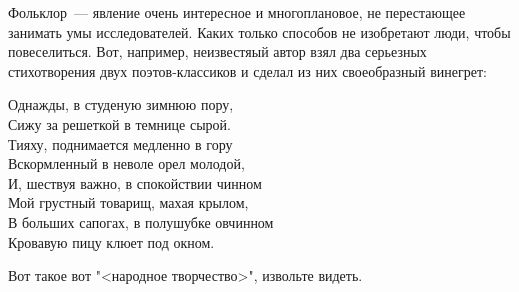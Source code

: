\documentclass[12pt]{article}
\begin{document}
Фольклор~--- явление очень интересное и многоплановое, не
перестающее занимать умы исследователей. Каких только
способов не изобретают люди, чтобы повеселиться. Вот,
например, неизвестяый автор взял два серьезных стихотворения
двух поэтов-классиков и сделал из них своеобразный винегрет:

\bigskip
\bigskip
\noindent Однажды, в студеную зимнюю пору, \\
Сижу за решеткой в темнице сырой.\\
Тияху, поднимается медленно в гору\\
Вскормленный в неволе орел молодой,\\
И, шествуя важно, в спокойствии чинном\\
Мой грустный товарищ, махая крылом,\\
В больших сапогах, в полушубке овчинном\\
Кровавую пицу клюет под окном.
\bigskip

Вот такое вот "<народное творчество>", извольте видеть.
\end{document}
